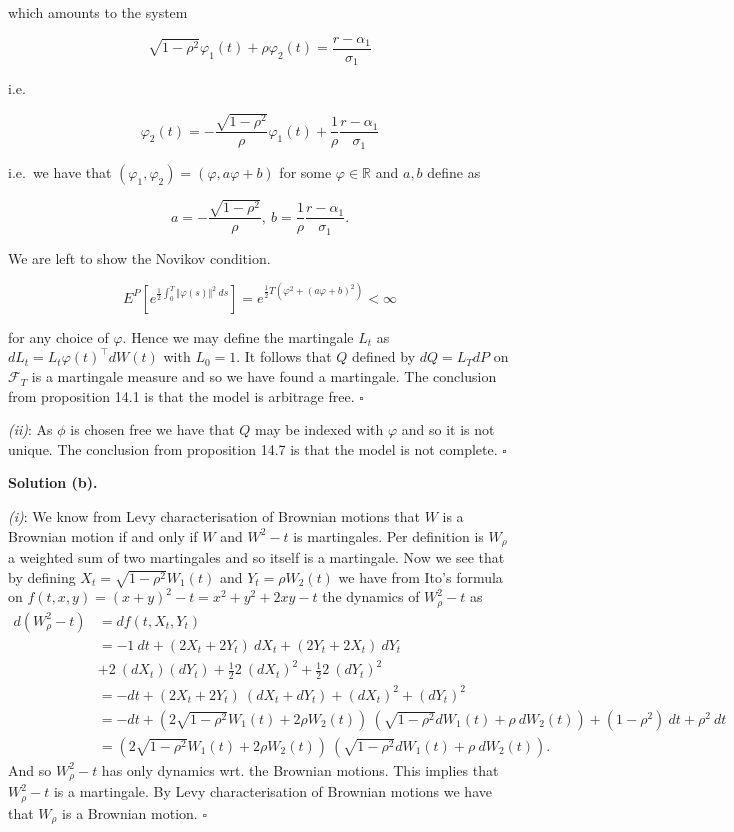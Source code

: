 \documentclass[a4paper,12pt,openany]{book}
\begin{document}
which amounts to the system

\[
\sqrt{1-\rho^2}\varphi_1(t)+\rho\varphi_2(t)=\frac{r-\alpha_1}{\sigma_1}
\]

i.e.

\[
\varphi_2(t)=-\frac{\sqrt{1-\rho^2}}{\rho}\varphi_1(t)+\frac{1}{\rho}\frac{r-\alpha_1}{\sigma_1}
\]

i.e.~we have that \((\varphi_1,\varphi_2)=(\varphi,a\varphi+b)\) for some \(\varphi\in\mathbb{R}\) and \(a,b\) define as

\[
a=-\frac{\sqrt{1-\rho^2}}{\rho},\ b=\frac{1}{\rho}\frac{r-\alpha_1}{\sigma_1}.
\]

We are left to show the Novikov condition.

\[
E^P\left[e^{\frac{1}{2}\int_0^T \Vert \varphi(s)\Vert ^2\ ds}\right]=e^{\frac{1}{2}T (\varphi^2+(a\varphi+b)^2)}<\infty
\]

for any choice of \(\varphi\). Hence we may define the martingale \(L_t\) as \(dL_t=L_t\varphi(t)^\top dW(t)\) with \(L_0=1\). It follows that \(Q\) defined by \(dQ=L_TdP\) on \(\mathcal{F}_T\) is a martingale measure and so we have found a martingale. The conclusion from proposition 14.1 is that the model is arbitrage free. \(\square\)

\emph{(ii)}: As \(\phi\) is chosen free we have that \(Q\) may be indexed with \(\varphi\) and so it is not unique. The conclusion from proposition 14.7 is that the model is not complete. \(\square\)

\noindent\makebox[\linewidth]{\rule{\textwidth}{0.4pt}}

\textbf{Solution (b).}

\emph{(i)}: We know from Levy characterisation of Brownian motions that \(W\) is a Brownian motion if and only if \(W\) and \(W^2-t\) is martingales. Per definition is \(W_\rho\) a weighted sum of two martingales and so itself is a martingale. Now we see that by defining \(X_t=\sqrt{1-\rho^2}W_1(t)\) and \(Y_t=\rho W_2(t)\) we have from Ito's formula on \(f(t,x,y)=(x+y)^2-t=x^2+y^2+2xy-t\) the dynamics of \(W_\rho^2-t\) as
\begin{align*}
d(W_\rho^2-t)&=df(t,X_t,Y_t)\\
&=-1\ dt+(2X_t+2Y_t)\ dX_t+(2Y_t+2X_t)\ dY_t\\
&+2\ (dX_t)(dY_t)+\frac{1}{2}2\ (dX_t)^2+\frac{1}{2}2\ (dY_t)^2\\
&=-dt+(2X_t+2Y_t)\ (dX_t+dY_t)+(dX_t)^2+(dY_t)^2\\
&=-dt+\left(2\sqrt{1-\rho^2}W_1(t)+2\rho W_2(t)\right)\ \left(\sqrt{1-\rho^2}dW_1(t)+\rho\ dW_2(t)\right)+(1-\rho^2)\ dt+\rho^2\ dt\\
&=\left(2\sqrt{1-\rho^2}W_1(t)+2\rho W_2(t)\right)\ \left(\sqrt{1-\rho^2}dW_1(t)+\rho\ dW_2(t)\right).
\end{align*}
And so \(W_\rho^2-t\) has only dynamics wrt. the Brownian motions. This implies that \(W_\rho^2-t\) is a martingale. By Levy characterisation of Brownian motions we have that \(W_\rho\) is a Brownian motion. \(\square\)
\end{document}
